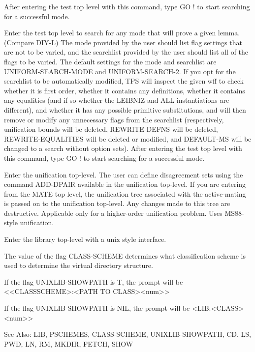 \begin{description}
After entering the test top level with this command, type GO ! to start 
searching for a successful mode.

\item[\parbox{\textwidth}{UNIFORM-SEARCH-L \textit{goal} \textit{support} \textit{line-range} \textit{window} \textit{mode} \textit{slist} \textit{modify}}]  
Enter the test top level to search for any mode that will prove
a given lemma. (Compare DIY-L) The mode provided by the user should list flag 
settings that are not to be varied, and the searchlist provided by the user should
list all of the flags to be varied. The default settings for the mode and
searchlist are UNIFORM-SEARCH-MODE and UNIFORM-SEARCH-2.
If you opt for the searchlist to be automatically modified, TPS will inspect
the given wff to check whether it is first order, whether it contains any 
definitions, whether it contains any equalities (and if so whether the LEIBNIZ
and ALL instantiations are different), and whether it has any possible primitive
substitutions, and will then remove or modify any unnecessary flags from the 
searchlist (respectively, unification bounds will be deleted, REWRITE-DEFNS will
be deleted, REWRITE-EQUALITIES will be deleted or modified, and DEFAULT-MS will
be changed to a search without option sets).
After entering the test top level with this command, type GO ! to start 
searching for a successful mode.

\item[\parbox{\textwidth}{UNIFY}]  
Enter the unification top-level. The user can define disagreement sets
using the command ADD-DPAIR available in the unification top-level. If you
are entering from the MATE top level, the unification tree associated with 
the active-mating is passed on to the unification top-level.
Any changes made to this tree are destructive. Applicable only for
a higher-order unification problem. Uses MS88-style unification.

\item[\parbox{\textwidth}{UNIXLIB}]  
Enter the library top-level with a unix style interface.

The value of the flag CLASS-SCHEME determines what classification scheme
is used to determine the virtual directory structure.

If the flag UNIXLIB-SHOWPATH is T, the prompt will be
<<CLASSSCHEME>:<PATH TO CLASS><num>>

If the flag UNIXLIB-SHOWPATH is NIL, the prompt will be
<LIB:<CLASS><num>>

See Also: LIB, PSCHEMES, CLASS-SCHEME, UNIXLIB-SHOWPATH, CD, LS, PWD, LN, RM,
MKDIR, FETCH, SHOW
\item
\end{description}

